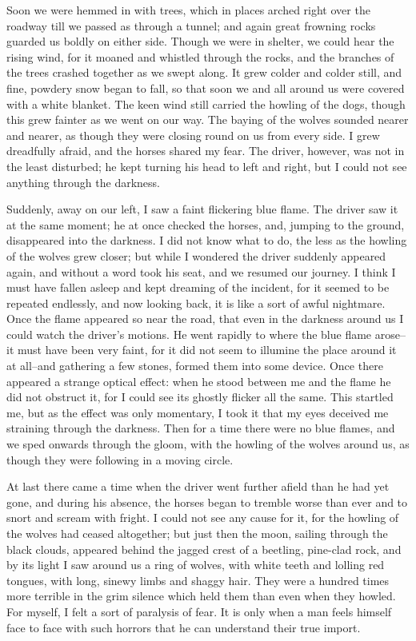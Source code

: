 \documentclass[12pt,openright]{book}
\begin{document}
Soon we were hemmed in with trees, which in places arched right over the roadway till we passed as through a tunnel; and again great frowning rocks guarded us boldly on either side. Though we were in shelter, we could hear the rising wind, for it moaned and whistled through the rocks, and the branches of the trees crashed together as we swept along. It grew colder and colder still, and fine, powdery snow began to fall, so that soon we and all around us were covered with a white blanket. The keen wind still carried the howling of the dogs, though this grew fainter as we went on our way. The baying of the wolves sounded nearer and nearer, as though they were closing round on us from every side. I grew dreadfully afraid, and the horses shared my fear. The driver, however, was not in the least disturbed; he kept turning his head to left and right, but I could not see anything through the darkness.

Suddenly, away on our left, I saw a faint flickering blue flame. The driver saw it at the same moment; he at once checked the horses, and, jumping to the ground, disappeared into the darkness. I did not know what to do, the less as the howling of the wolves grew closer; but while I wondered the driver suddenly appeared again, and without a word took his seat, and we resumed our journey. I think I must have fallen asleep and kept dreaming of the incident, for it seemed to be repeated endlessly, and now looking back, it is like a sort of awful nightmare. Once the flame appeared so near the road, that even in the darkness around us I could watch the driver’s motions. He went rapidly to where the blue flame arose–it must have been very faint, for it did not seem to illumine the place around it at all–and gathering a few stones, formed them into some device. Once there appeared a strange optical effect: when he stood between me and the flame he did not obstruct it, for I could see its ghostly flicker all the same. This startled me, but as the effect was only momentary, I took it that my eyes deceived me straining through the darkness. Then for a time there were no blue flames, and we sped onwards through the gloom, with the howling of the wolves around us, as though they were following in a moving circle.

At last there came a time when the driver went further afield than he had yet gone, and during his absence, the horses began to tremble worse than ever and to snort and scream with fright. I could not see any cause for it, for the howling of the wolves had ceased altogether; but just then the moon, sailing through the black clouds, appeared behind the jagged crest of a beetling, pine-clad rock, and by its light I saw around us a ring of wolves, with white teeth and lolling red tongues, with long, sinewy limbs and shaggy hair. They were a hundred times more terrible in the grim silence which held them than even when they howled. For myself, I felt a sort of paralysis of fear. It is only when a man feels himself face to face with such horrors that he can understand their true import.
\end{document}
